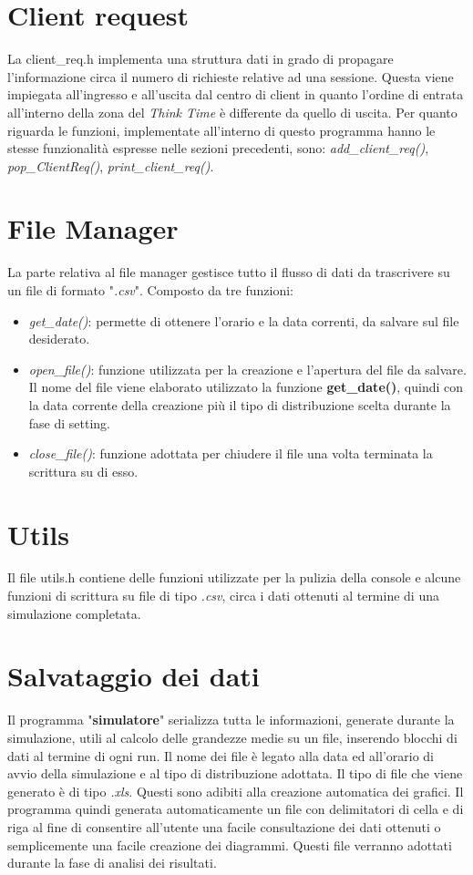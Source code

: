 \section{Client request}
La client\_req.h implementa una struttura dati in grado di propagare l'informazione circa il numero di richieste relative ad una sessione. Questa viene impiegata all'ingresso e all'uscita dal centro di client in quanto l'ordine di entrata all'interno della zona del \textit{Think Time} è differente da quello di uscita.
Per quanto riguarda le funzioni, implementate all'interno di questo programma hanno le stesse funzionalità espresse nelle sezioni precedenti, sono: \textit{add\_client\_req()}, \textit{pop\_ClientReq()}, \textit{print\_client\_req()}.

\section{File Manager}
La parte relativa al file manager gestisce tutto il flusso di dati da trascrivere  su un file di formato "\textit{.csv}". Composto da tre funzioni:
\begin{itemize}
\item \textit{get\_date()}: permette di ottenere l'orario e la data correnti, da salvare sul file desiderato.
\item \textit{open\_file()}: funzione utilizzata per la creazione e l'apertura del file da salvare. Il nome del file viene elaborato utilizzato la funzione \textbf{get\_date()}, quindi con la data corrente della creazione più il tipo di distribuzione scelta durante la fase di setting.
\item \textit{close\_file()}: funzione adottata per chiudere il file una volta terminata la scrittura su di esso.
\end{itemize}

\section{Utils}
Il file utils.h contiene delle funzioni utilizzate per la pulizia della console e alcune funzioni di scrittura su file di tipo \textit{.csv}, circa i dati ottenuti al termine di una simulazione completata.

\section{Salvataggio dei dati}
Il programma "\textbf{simulatore}" serializza tutta le informazioni, generate durante la simulazione, utili al calcolo delle grandezze medie su un file, inserendo blocchi di dati al termine di ogni run.
Il nome dei file è legato alla data ed all'orario di avvio della simulazione e al tipo di distribuzione adottata.
Il tipo di file che viene generato è di tipo \textit{.xls}. Questi sono adibiti alla creazione automatica dei grafici. Il programma quindi generata automaticamente un file con delimitatori di cella e di riga al fine di consentire all'utente una facile consultazione dei dati ottenuti o semplicemente una facile creazione dei diagrammi. Questi file verranno adottati durante la fase di analisi dei risultati.

